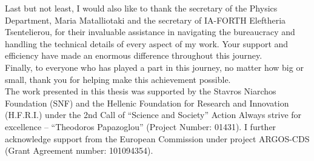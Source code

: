 \documentclass[main.tex]{subfiles}
\begin{document}
    \noindent Last but not least, I would also like to thank the secretary of the Physics Department, Maria Matalliotaki and the secretary of IA-FORTH Eleftheria Tsentelierou, for their invaluable assistance in navigating the bureaucracy and handling the technical details of every aspect of my work. Your support and efficiency have made an enormous difference throughout this journey. \\

    \noindent Finally, to everyone who has played a part in this journey, no matter how big or small, thank you for helping make this achievement possible.\\

    \noindent The work presented in this thesis was supported by the Stavros Niarchos Foundation (SNF) and the Hellenic Foundation for Research and Innovation (H.F.R.I.) under the 2nd Call of ``Science and Society'' Action Always strive for excellence -- ``Theodoros Papazoglou'' (Project Number: 01431). I further acknowledge support from the European Commission under project ARGOS-CDS (Grant Agreement number: 101094354).
\end{document}
